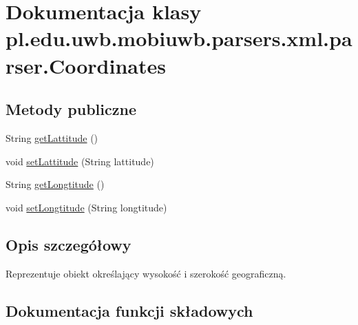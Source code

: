 \hypertarget{classpl_1_1edu_1_1uwb_1_1mobiuwb_1_1parsers_1_1xml_1_1parser_1_1_coordinates}{}\section{Dokumentacja klasy pl.\+edu.\+uwb.\+mobiuwb.\+parsers.\+xml.\+parser.\+Coordinates}
\label{classpl_1_1edu_1_1uwb_1_1mobiuwb_1_1parsers_1_1xml_1_1parser_1_1_coordinates}
\subsection*{Metody publiczne}
\begin{DoxyCompactItemize}
\item 
String \hyperlink{classpl_1_1edu_1_1uwb_1_1mobiuwb_1_1parsers_1_1xml_1_1parser_1_1_coordinates_a3dda2d7e93cf02b2933d8a188675ef85}{get\+Lattitude} ()
\item 
void \hyperlink{classpl_1_1edu_1_1uwb_1_1mobiuwb_1_1parsers_1_1xml_1_1parser_1_1_coordinates_a6434c788fd3c1c1ae6fb41ac28a1fb81}{set\+Lattitude} (String lattitude)
\item 
String \hyperlink{classpl_1_1edu_1_1uwb_1_1mobiuwb_1_1parsers_1_1xml_1_1parser_1_1_coordinates_a814ab0d7e3cc38bb9abf6f7be51683fe}{get\+Longtitude} ()
\item 
void \hyperlink{classpl_1_1edu_1_1uwb_1_1mobiuwb_1_1parsers_1_1xml_1_1parser_1_1_coordinates_a8811be68326aea8f4d49f1074c9cf368}{set\+Longtitude} (String longtitude)
\end{DoxyCompactItemize}


\subsection{Opis szczegółowy}
Reprezentuje obiekt określający wysokość i szerokość geograficzną. 

\subsection{Dokumentacja funkcji składowych}
\hypertarget{classpl_1_1edu_1_1uwb_1_1mobiuwb_1_1parsers_1_1xml_1_1parser_1_1_coordinates_a3dda2d7e93cf02b2933d8a188675ef85}{}
